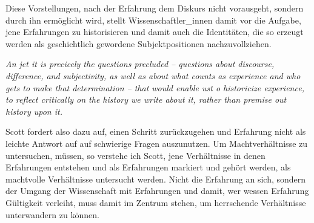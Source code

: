 Diese Vorstellungen, nach der Erfahrung dem Diskurs nicht vorausgeht, sondern
durch ihn ermöglicht wird, stellt Wissenschaftler\_innen damit vor die Aufgabe,
jene Erfahrungen zu historisieren und damit auch die Identitäten, die so
erzeugt werden als geschichtlich gewordene Subjektpositionen nachzuvollziehen. 

\begin{myenv}
  \textit{\glqq 
  An jet it is precicely the questions precluded – questions about discourse, difference, and subjectivity, as well as about what counts as experience and who gets to make that determination – that would enable ust o historicize experience, to reflect critically on the history we write about it, rather than premise out history upon it.  
  \grqq}
\footnotemark {}
\end{myenv}

Scott fordert also dazu auf, einen Schritt zurückzugehen und Erfahrung nicht
als leichte Antwort auf auf schwierige Fragen auszunutzen. Um Machtverhältnisse
zu untersuchen, müssen, so verstehe ich Scott, jene Verhältnisse in denen
Erfahrungen entstehen und als Erfahrungen markiert und gehört werden, als
machtvolle Verhältnisse untersucht werden. Nicht die Erfahrung an sich, sondern
der Umgang der Wissenschaft mit Erfahrungen und damit, wer wessen Erfahrung
Gültigkeit verleiht, muss damit im Zentrum stehen, um herrschende Verhältnisse
unterwandern zu können.

